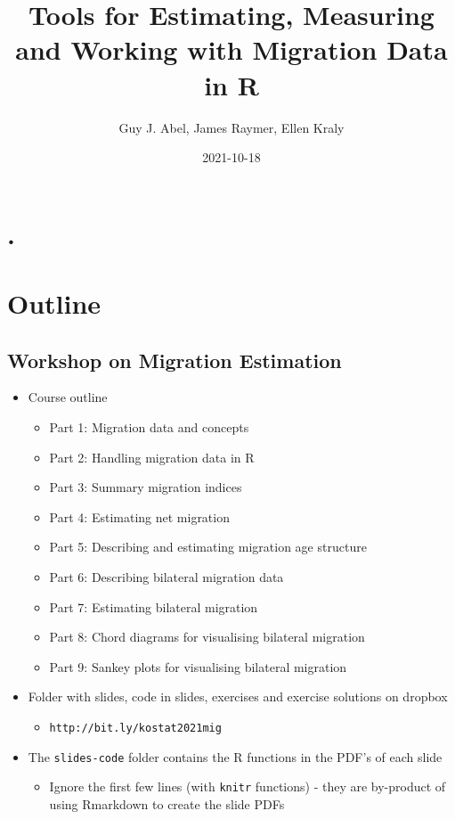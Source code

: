 \documentclass[
]{book}
\title{Tools for Estimating, Measuring and Working with Migration Data in R}
\author{Guy J. Abel, James Raymer, Ellen Kraly}
\date{2021-10-18}
\providecommand{\tightlist}{%
  \setlength{\itemsep}{0pt}\setlength{\parskip}{0pt}}
\begin{document}
\maketitle

{
\setcounter{tocdepth}{1}
\tableofcontents
}
\hypertarget{section}{%
\chapter{.}\label{section}}

\hypertarget{outline}{%
\chapter{Outline}\label{outline}}

\hypertarget{workshop-on-migration-estimation}{%
\section{Workshop on Migration Estimation}\label{workshop-on-migration-estimation}}

\begin{itemize}
\tightlist
\item
  Course outline

  \begin{itemize}
  \tightlist
  \item
    Part 1: Migration data and concepts
  \item
    Part 2: Handling migration data in R
  \item
    Part 3: Summary migration indices
  \item
    Part 4: Estimating net migration
  \item
    Part 5: Describing and estimating migration age structure
  \item
    Part 6: Describing bilateral migration data
  \item
    Part 7: Estimating bilateral migration
  \item
    Part 8: Chord diagrams for visualising bilateral migration
  \item
    Part 9: Sankey plots for visualising bilateral migration
  \end{itemize}
\item
  Folder with slides, code in slides, exercises and exercise solutions on dropbox

  \begin{itemize}
  \tightlist
  \item
    \texttt{http://bit.ly/kostat2021mig}
  \end{itemize}
\item
  The \texttt{slides-code} folder contains the R functions in the PDF's of each slide

  \begin{itemize}
  \tightlist
  \item
    Ignore the first few lines (with \texttt{knitr} functions) - they are by-product of using Rmarkdown to create the slide PDFs
  \end{itemize}
\end{itemize}
\end{document}
